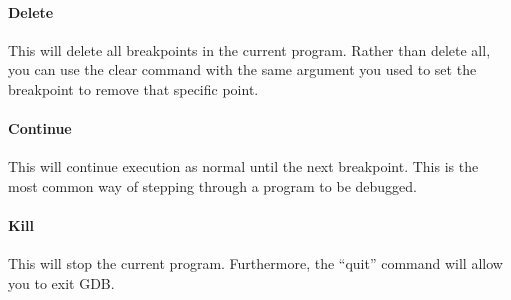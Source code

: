 		\paragraph{Delete}
		This will delete all breakpoints in the current program. 
		Rather than delete all, 
		you can use the clear command with the same argument you used to set the breakpoint to remove that specific point. 

		\paragraph{Continue}
		This will continue execution as normal until the next breakpoint. 
		This is the most common way of stepping through a program to be debugged. 
			
		\paragraph{Kill}
		This will stop the current program. 
		Furthermore, the ``quit'' command will allow you to exit GDB. 

